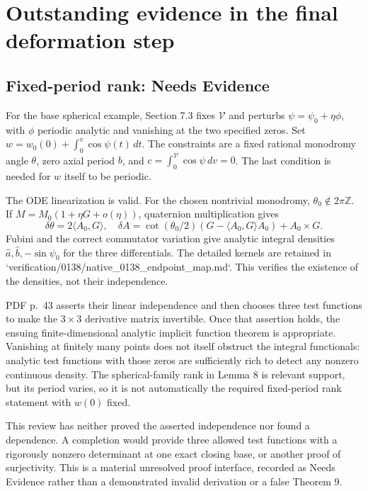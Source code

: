 \documentclass[10pt]{article}
\begin{document}
\section*{Outstanding evidence in the final deformation step}
\subsection*{Fixed-period rank: Needs Evidence}
For the base spherical example, Section 7.3 fixes \(\mathcal V\) and perturbs \(\psi=\psi_0+\eta\phi\), with \(\phi\) periodic analytic and vanishing at the two specified zeros. Set \(w=w_0(0)+\int_0^v\cos\psi(t)\,dt\). The constraints are a fixed rational monodromy angle \(\theta\), zero axial period \(b\), and \(c=\int_0^\mathcal V\cos\psi\,dv=0\). The last condition is needed for \(w\) itself to be periodic.\par
The ODE linearization is valid. For the chosen nontrivial monodromy, \(\theta_0\notin2\pi\mathbb Z\). If \(M=M_0(1+\eta G+o(\eta))\), quaternion multiplication gives \[\delta\theta=2\langle A_0,G\rangle,\quad
 \delta A=\cot(\theta_0/2)
       (G-\langle A_0,G\rangle A_0)+A_0\times G.\] Fubini and the correct commutator variation give analytic integral densities \(\widehat a,\widehat b,-\sin\psi_0\) for the three differentials. The detailed kernels are retained in `verification/0138/native\_0138\_endpoint\_map.md`. This verifies the existence of the densities, not their independence.\par
PDF p. 43 asserts their linear independence and then chooses three test functions to make the \(3\times3\) derivative matrix invertible. Once that assertion holds, the ensuing finite-dimensional analytic implicit function theorem is appropriate. Vanishing at finitely many points does not itself obstruct the integral functionals: analytic test functions with those zeros are sufficiently rich to detect any nonzero continuous density. The spherical-family rank in Lemma 8 is relevant support, but its period varies, so it is not automatically the required fixed-period rank statement with \(w(0)\) fixed.\par
This review has neither proved the asserted independence nor found a dependence. A completion would provide three allowed test functions with a rigorously nonzero determinant at one exact closing base, or another proof of surjectivity. This is a material unresolved proof interface, recorded as Needs Evidence rather than a demonstrated invalid derivation or a false Theorem 9.\par
\end{document}
